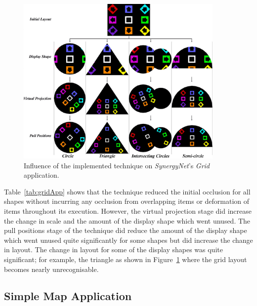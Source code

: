 \documentclass[twocolumn,compsoc]{cvm}
\begin{document}
{\begin{figure}[p]
 \centering
  \includegraphics[width=0.9\textwidth]{figures/GridApplication.jpeg}
  \caption{Influence of the implemented technique on {\emph{SynergyNet}}'s {\emph{Grid}} application.}
  \label{fig:gridApp}
\end{figure}

Table~\ref{tab:gridApp} shows that the technique reduced the initial occlusion for all shapes without incurring any occlusion from overlapping items or deformation of items throughout its execution.
However, the virtual projection stage did increase the change in scale and the amount of the display shape which went unused.
The pull positions stage of the technique did reduce the amount of the display shape which went unused quite significantly for some shapes but did increase the change in layout.
The change in layout for some of the display shapes was quite significant; for example, the triangle as shown in Figure~\ref{fig:gridApp} where the grid layout becomes nearly unrecognisable.


\subsection{Simple Map Application}
\label{subsec:simplemapresults} 

}
\end{document}
